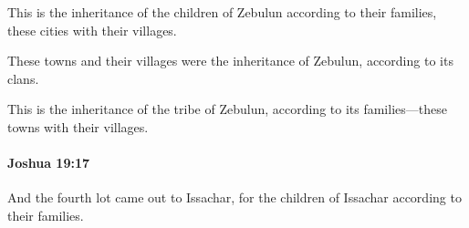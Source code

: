 			\begin{versebox}
					\item[BHS] 
					\item[ASV] This is the inheritance of the children of Zebulun according to their families, these cities with their villages.
					\item[NIV] These towns and their villages were the inheritance of Zebulun, according to its clans.
					\item[NRSV] This is the inheritance of the tribe of Zebulun, according to its families—these towns with their villages.
			\end{versebox}

		\paragraph{Joshua 19:17} %
			\label{JOSHUA-19-17}

			And the fourth lot came out to Issachar, for the children of Issachar according to their families.

